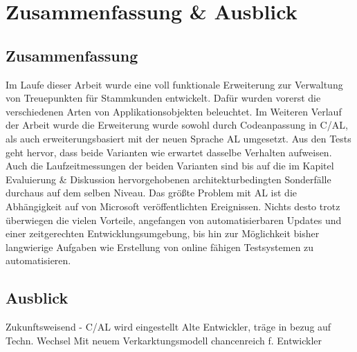 \chapter{Zusammenfassung \& Ausblick}
\label{cha:Diskussion}

\section{Zusammenfassung}
Im Laufe dieser Arbeit wurde eine voll funktionale Erweiterung zur Verwaltung von Treuepunkten für Stammkunden entwickelt. Dafür wurden vorerst die verschiedenen Arten von Applikationsobjekten beleuchtet. Im Weiteren Verlauf der Arbeit wurde die Erweiterung wurde sowohl durch Codeanpassung in C/AL, als auch erweiterungsbasiert mit der neuen Sprache AL umgesetzt. Aus den Tests geht hervor, dass beide Varianten wie erwartet dasselbe Verhalten aufweisen.  Auch die Laufzeitmessungen der beiden Varianten sind bis auf die im Kapitel Evaluierung \& Diskussion hervorgehobenen architekturbedingten Sonderfälle durchaus auf dem selben Niveau. Das größte Problem mit AL ist die Abhängigkeit auf von Microsoft veröffentlichten Ereignissen. Nichts desto trotz überwiegen die vielen Vorteile, angefangen von automatisierbaren Updates und einer zeitgerechten Entwicklungsumgebung, bis hin zur Möglichkeit bisher langwierige Aufgaben wie Erstellung von online fähigen Testsystemen zu automatisieren.

\section{Ausblick}
Zukunftsweisend - C/AL wird eingestellt
Alte Entwickler, träge in bezug auf Techn. Wechsel
Mit neuem Verkarktungsmodell chancenreich f. Entwickler

